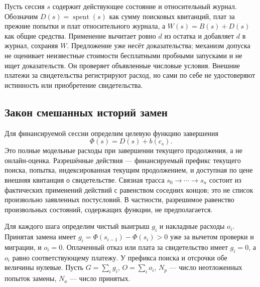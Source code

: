 \documentclass[10pt,a4paper]{article}
\newcommand{\spent}{\operatorname{spent}}
\begin{document}
Пусть сессия $s$ содержит действующее состояние и относительный журнал. Обозначим $D(s)=\spent(s)$ как сумму поисковых квитанций, плат за прежние попытки и плат относительного журнала, а $W(s)=B(s)+D(s)$ как общие средства. Применение вычитает ровно $d$ из остатка и добавляет $d$ в журнал, сохраняя $W$. Предложение уже несёт доказательства; механизм допуска не оценивает неизвестные стоимости бесплатными пробными запусками и не ищет доказательств. Он проверяет объявленные числовые условия. Внешние платежи за свидетельства регистрируют расход, но сами по себе не удостоверяют истинность или приобретение свидетельства.

\subsection{Закон смешанных историй замен}
Для финансируемой сессии определим целевую функцию завершения
\begin{equation}\label{eq:root-objective}
 \Phi(s)=D(s)+b(c_s).
\end{equation}
Это полные модельные расходы при завершении текущего продолжения, а не онлайн-оценка. Разрешённые действия --- финансируемый префикс текущего поиска, попытка, индексированная текущим продолжением, и доступная по цене внешняя квитанция о свидетельстве. Связная трасса $s_0\to\cdots\to s_n$ состоит из фактических применений действий с равенством соседних концов; это не список произвольно заявленных постусловий. В частности, разрешимое равенство произвольных состояний, содержащих функции, не предполагается.

Для каждого шага определим чистый выигрыш $g_i$ и накладные расходы $o_i$. Принятая замена имеет $g_i=\Phi(s_{i-1})-\Phi(s_i)>0$ уже за вычетом проверки и миграции, и $o_i=0$. Оплаченный отказ или плата за свидетельство имеет $g_i=0$, а $o_i$ равно соответствующему платежу. У префикса поиска и отсрочки обе величины нулевые. Пусть $G=\sum_i g_i$, $O=\sum_i o_i$, $N_p$ --- число неотложенных попыток замены, $N_a$ --- число принятых.
\end{document}
